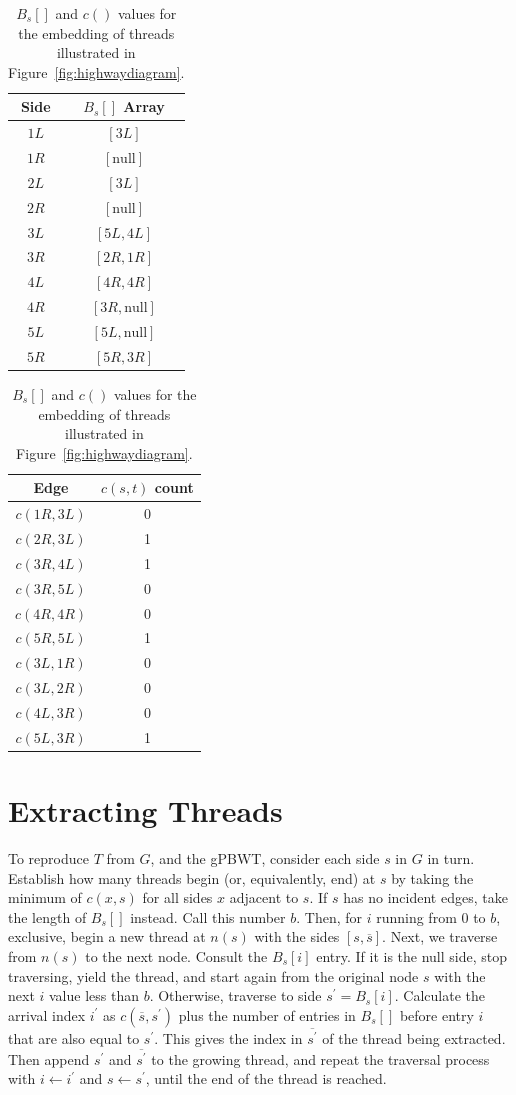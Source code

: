 \begin{table}[h!]
\caption[gPBWT Arrays]{$B_s[]$ and $c()$ values for the embedding of threads illustrated in Figure~\ref{fig:highwaydiagram}.}
\label{tbl:barrays}
\centering
\begin{tabular} { c | c }
Side & $B_s[]$ Array \\
\hline
$1L$ & $[3L]$ \\
$1R$ & $[\mathrm{null}]$ \\
$2L$ & $[3L]$ \\
$2R$ & $[\mathrm{null}]$ \\
$3L$ & $[5L, 4L]$ \\
$3R$ & $[2R, 1R]$ \\
$4L$ & $[4R, 4R]$ \\
$4R$ & $[3R, \mathrm{null}]$ \\
$5L$ & $[5L, \mathrm{null}]$ \\
$5R$ & $[5R, 3R]$ \\
\end{tabular}
\begin{tabular}{ c | c }
Edge & $c(s, t)$ count \\
\hline
$c(1R, 3L)$ & 0 \\
$c(2R, 3L)$ & 1 \\
$c(3R, 4L)$ & 1 \\
$c(3R, 5L)$ & 0 \\
$c(4R, 4R)$ & 0 \\
$c(5R, 5L)$ & 1 \\
$c(3L, 1R)$ & 0 \\
$c(3L, 2R)$ & 0 \\
$c(4L, 3R)$ & 0 \\
$c(5L, 3R)$ & 1 \\
\end{tabular}

\end{table}


\section{Extracting Threads}

To reproduce $T$ from $G$, and the gPBWT, consider each side $s$ in $G$ in turn. Establish how many threads begin (or, equivalently, end) at $s$ by taking the minimum of $c(x, s)$ for all sides $x$ adjacent to $s$. If $s$ has no incident edges, take the length of $B_s[]$ instead. Call this number $b$. Then, for $i$ running from 0 to $b$, exclusive, begin a new thread at $n(s)$ with the sides $[s, \overline{s}]$. Next, we traverse from $n(s)$ to the next node. Consult the $B_s[i]$ entry. If it is the null side, stop traversing, yield the thread, and start again from the original node $s$ with the next $i$ value less than $b$. Otherwise, traverse to side $s^\prime = B_s[i]$. Calculate the arrival index $i^\prime$ as $c(\overline{s}, s^\prime)$ plus the number of entries in $B_s[]$ before entry $i$ that are also equal to $s^\prime$. This gives the index in $\overline{s^\prime}$ of the thread being extracted.  Then append $s^\prime$ and $\overline{s^\prime}$ to the growing thread, and repeat the traversal process with $i \leftarrow i^\prime$ and $s \leftarrow s^\prime$, until the end of the thread is reached. 

